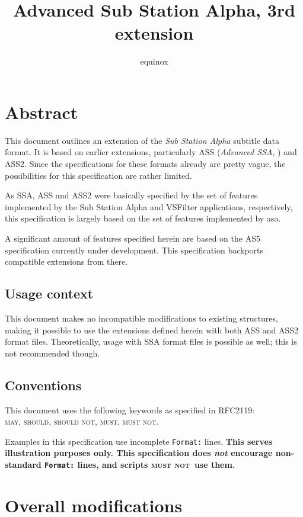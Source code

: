 \documentclass[11pt,a4paper]{article}
\newcommand{\may}{\textsc{may}}
\newcommand{\should}{\textsc{should}}
\newcommand{\shouldnot}{\textsc{should not}}
\newcommand{\must}{\textsc{must}}
\newcommand{\mustnot}{\textsc{must not}}
\begin{document}
\title{Advanced Sub Station Alpha, 3rd extension}
\author{equinox}
\maketitle

\tableofcontents
\newpage
\setlength{\parskip}{8pt}
\section{Abstract}
This document outlines an extension of the \emph{Sub Station Alpha}\cite{SSA}
subtitle data format. It is based on earlier extensions, particularly
ASS (\emph{Advanced SSA}, \cite{ASS}) and ASS2\cite{ASS2}. Since the
specifications for these formats already are pretty vague, the possibilities
for this specification are rather limited.

As SSA, ASS and ASS2 were basically specified by the set of features
implemented by the Sub Station Alpha and VSFilter\cite{VSFilter} applications,
respectively, this specification is largely based on the set of features
implemented by asa\cite{asa}.

A significant amount of features specified herein are based on the
AS5\cite{AS5} specification currently under development. This specification
backports compatible extensions from there.

\subsection{Usage context}
This document makes no incompatible modifications to existing structures,
making it possible to use the extensions defined herein with both ASS and
ASS2 format files. Theoretically, usage with SSA format files is possible
as well; this is not recommended though.

\subsection{Conventions}
This document uses the following keywords as specified in RFC2119\cite{2119}:\\
\may, \should, \shouldnot, \must, \mustnot.

Examples in this specification use incomplete \texttt{Format:} lines.
\textbf{This serves illustration purposes only. This specification does \emph{not}
encourage non-standard \texttt{Format:} lines, and scripts \mustnot\ use them.}

\section{Overall modifications}
\end{document}
